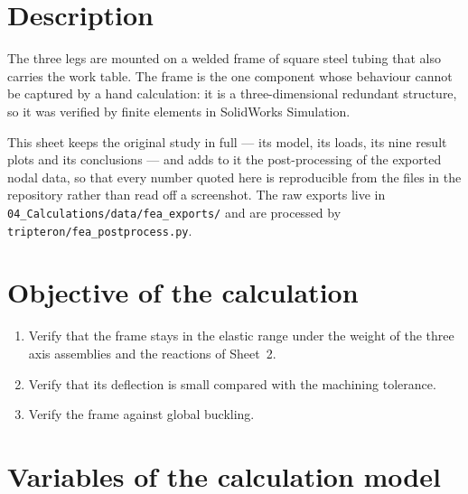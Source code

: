 \documentclass[11pt]{article}
\begin{document}
\section{Description}\label{sec:fea-desc}

The three legs are mounted on a welded frame of square steel tubing that also carries the
work table. The frame is the one component whose behaviour cannot be captured by a hand
calculation: it is a three-dimensional redundant structure, so it was verified by finite
elements in SolidWorks Simulation.

This sheet keeps the original study in full --- its model, its loads, its nine result plots
and its conclusions --- and adds to it the post-processing of the exported nodal data, so
that every number quoted here is reproducible from the files in the repository rather than
read off a screenshot. The raw exports live in
\texttt{04\_Calculations/data/fea\_exports/} and are processed by
\texttt{tripteron/fea\_postprocess.py}.

\section{Objective of the calculation}\label{sec:fea-obj}

\begin{enumerate}[leftmargin=*,nosep]
  \item Verify that the frame stays in the elastic range under the weight of the three
        axis assemblies and the reactions of Sheet~2.
  \item Verify that its deflection is small compared with the machining tolerance.
  \item Verify the frame against global buckling.
\end{enumerate}

\section{Variables of the calculation model}\label{sec:fea-var}
\end{document}
